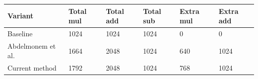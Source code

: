 \begin{tabular}{llllll}
\hline
Variant & Total mul & Total add & Total sub & Extra mul & Extra add \\
\hline
Baseline & 1024 & 1024 & 1024 & 0 & 0 \\
Abdelmonem et al. & 1664 & 2048 & 1024 & 640 & 1024 \\
Current method & 1792 & 2048 & 1024 & 768 & 1024 \\
\hline
\end{tabular}
